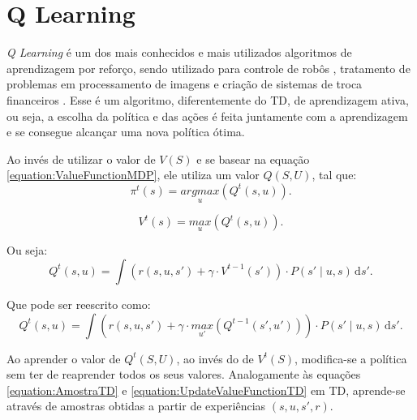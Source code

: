 \section{Q Learning} \label{section:QLearning}

\textit{Q Learning} é um dos mais conhecidos e mais utilizados algoritmos de aprendizagem por reforço, sendo utilizado para controle de robôs \cite{Gaskett:2002}, tratamento de problemas em processamento de imagens \cite{Alexandru-Learning} e criação de sistemas de troca financeiros \cite{RePEc:ven:wpaper:2014:15}. Esse é um algoritmo, diferentemente do TD, de aprendizagem ativa, ou seja, a escolha da política e das ações é feita juntamente com a aprendizagem e se consegue alcançar uma nova política ótima.

Ao invés de utilizar o valor de $ V \left( S \right) $ e se basear na equação \ref{equation:ValueFunctionMDP}, ele utiliza um valor $ Q \left( S, U \right) $, tal que:
\begin{equation} \label{equation:PolicySelectionQLearning}
    \pi^t \left( s \right) = \underset{u}{argmax} \left( Q^t \left( s, u \right) \right).
\end{equation}

\begin{equation}
    V^t \left( s \right) = \underset{u}{max} \left( Q^t \left( s, u \right) \right).
\end{equation}

Ou seja:
\begin{equation} \label{equation:QValueFunctionQLearning}
    Q^t \left( s, u \right) = \int \! \left( r \left( s, u, s' \right) + \gamma \cdot V^{t-1} \left( s' \right) \right) \cdot P \left( s' \mid u, s \right) \, \mathrm{d}s'.
\end{equation}

Que pode ser reescrito como:
\begin{equation} \label{equation:QValueFunctionQLearningFinal}
    Q^t \left( s, u \right) = \int \! \left( r \left( s, u, s' \right) + \gamma \cdot \underset{u'}{max} \left( Q^{t-1} \left( s', u' \right) \right) \right) \cdot P \left( s' \mid u, s \right) \, \mathrm{d}s'.
\end{equation}

Ao aprender o valor de $ Q^t \left( S, U \right) $, ao invés do de $ V^t \left( S \right) $, modifica-se a política sem ter de reaprender todos os seus valores. Analogamente às equações \ref{equation:AmostraTD} e \ref{equation:UpdateValueFunctionTD} em TD, aprende-se através de amostras obtidas a partir de experiências $ \left( s, u, s', r \right) $.

